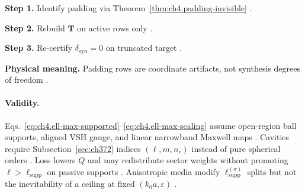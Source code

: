 \textbf{Step 1.} Identify padding via Theorem~\ref{thm:ch4.padding-invisible} \cite{harrington2001}.

\textbf{Step 2.} Rebuild \(\mathbf{T}\) on active rows only \cite{devaney2004,hansen1988}.

\textbf{Step 3.} Re-certify \(\delta_{\mathrm{syn}}=0\) on truncated target \cite{stratton1941}.

\textbf{Physical meaning.} Padding rows are coordinate artifacts, not synthesis degrees of freedom \cite{hansen1988}.

\paragraph{Validity.}
Eqs.~\eqref{eq:ch4.ell-max-supported}--\eqref{eq:ch4.ell-max-scaling} assume open-region ball supports, aligned VSH gauge, and linear
narrowband Maxwell maps \cite{stratton1941,hansen1988}. Cavities require Subsection~\ref{sec:ch372} indices \((\ell,m,n_{r})\) instead of
pure spherical orders \cite{harrington2001}. Loss lowers \(Q\) and may redistribute sector weights without promoting \(\ell>\ell_{\mathrm{supp}}\)
on passive supports \cite{stratton1941,devaney2004}. Anisotropic media modify \(\ell_{\mathrm{supp}}^{(\sigma)}\) splits but not the
inevitability of a ceiling at fixed \((k_{0}a,\varepsilon)\) \cite{hansen1988,harrington2001}.

